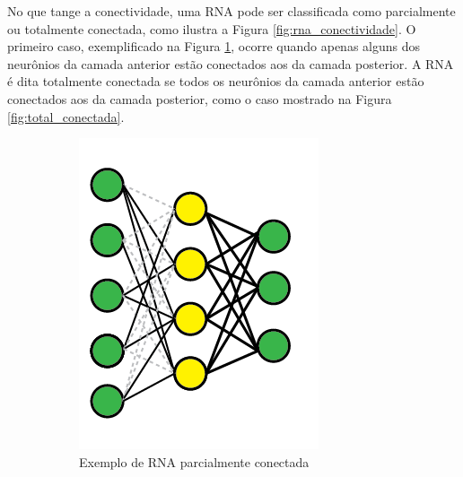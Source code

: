 No que tange a conectividade, uma RNA pode ser classificada como parcialmente ou totalmente conectada, como ilustra a Figura \ref{fig:rna_conectividade}. O primeiro caso, exemplificado na Figura \ref{fig:parc_conectada}, ocorre quando apenas alguns dos neurônios da camada anterior estão conectados aos da camada posterior. A RNA é dita totalmente conectada se todos os neurônios da camada anterior estão conectados aos da camada posterior, como o caso mostrado na Figura \ref{fig:total_conectada}.

\begin{figure}
	\begin{subfigure}[h]{0.3\linewidth}
		\includegraphics[width=\linewidth]{img/parcialmenteconectada}
		\caption{Exemplo de RNA parcialmente conectada}
		\label{fig:parc_conectada}
	\end{subfigure}
	\hfill
	\begin{subfigure}[h]{0.3\linewidth}

\end{subfigure}
\end{figure}
